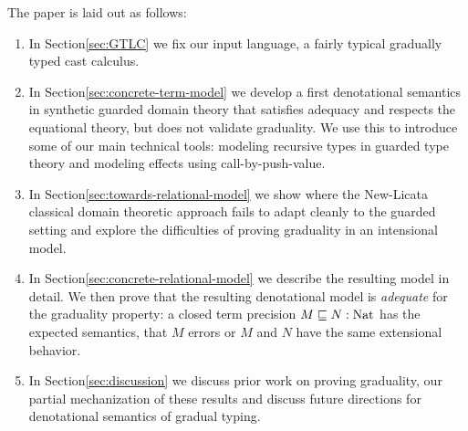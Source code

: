 The paper is laid out as follows:
\begin{enumerate}
\item In Section\ref{sec:GTLC} we fix our input language, a fairly
  typical gradually typed cast calculus.
\item In Section\ref{sec:concrete-term-model} we develop a first
  denotational semantics in synthetic guarded domain theory that
  satisfies adequacy and respects the equational theory, but does not
  validate graduality. We use this to introduce some of our main
  technical tools: modeling recursive types in guarded type theory and
  modeling effects using call-by-push-value.
\item In Section\ref{sec:towards-relational-model} we show where the
  New-Licata classical domain theoretic approach fails to adapt
  cleanly to the guarded setting and explore the difficulties of
  proving graduality in an intensional model.
\item In Section\ref{sec:concrete-relational-model} we describe the resulting
  model in detail. We then prove that the resulting denotational model is
  \emph{adequate} for the graduality property: a closed term precision $M \sqsubseteq
  N : \text{Nat}$ has the expected semantics, that $M$ errors or $M$ and $N$ have the
  same extensional behavior.
\item In Section\ref{sec:discussion} we discuss prior work on proving
  graduality, our partial mechanization of these results and discuss
  future directions for denotational semantics of gradual typing.
\end{enumerate}
